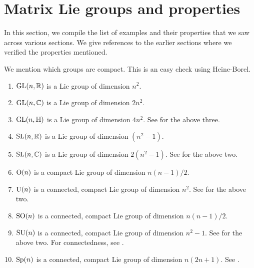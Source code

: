 \documentclass[12pt]{article}
\begin{document}
\section{Matrix Lie groups and properties}

In this section, we compile the list of examples and their properties that we saw across various sections. 
We give references to the earlier sections where we verified the properties mentioned.

We mention which groups are compact. This is an easy check using Heine-Borel.

\begin{enumerate}[label=(\alph*)]
	\item $\operatorname{GL}(n, \mathbb{R})$ is a Lie group of dimension $n^{2}$.
	\item $\operatorname{GL}(n, \mathbb{C})$ is a Lie group of dimension $2n^{2}$.
	\item $\operatorname{GL}(n, \mathbb{H})$ is a Lie group of dimension $4n^{2}$. \newline
	See  for the above three.
	\item $\operatorname{SL}(n, \mathbb{R})$ is a Lie group of dimension $(n^{2} - 1)$.
	\item $\operatorname{SL}(n, \mathbb{C})$ is a Lie group of dimension $2(n^{2} - 1)$. \newline
	See  for the above two.
	\item $\operatorname{O}(n)$ is a compact Lie group of dimension $n(n - 1)/2$.
	\item $\operatorname{U}(n)$ is a connected, compact Lie group of dimension $n^{2}$. \newline
	See  for the above two.
	\item $\operatorname{SO}(n)$ is a connected, compact Lie group of dimension $n(n - 1)/2$.
	\item $\operatorname{SU}(n)$ is a connected, compact Lie group of dimension $n^{2} - 1$. \newline
	See  for the above two. For connectedness, see .
	\item $\operatorname{Sp}(n)$ is a connected, compact Lie group of dimension $n(2n + 1)$. See .
\end{enumerate}
\end{document}
